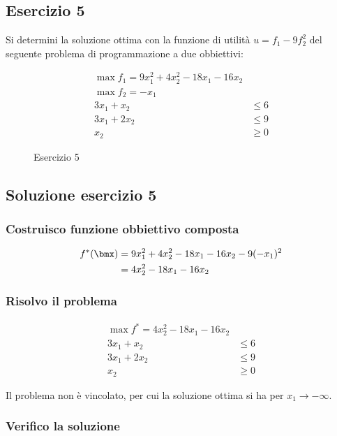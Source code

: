 \documentclass[\main/main.tex]{subfiles}
\begin{document}
\subsection{Esercizio 5}
Si determini la soluzione ottima con la funzione di utilità $u = f_1 - 9f_2^2$ del seguente problema di programmazione a due obbiettivi:

\begin{figure}
  \begin{align*}
    \max f_1 = 9x_1^2 + 4x_2^2 - 18x_1 - 16x_2 \\
    \max f_2 = -x_1                            \\
    3x_1 + x_2  & \leq 6                       \\
    3x_1 + 2x_2 & \leq 9                       \\
    x_2         & \geq 0
  \end{align*}
  \caption{Esercizio 5}
\end{figure}

\subsection{Soluzione esercizio 5}
\subsubsection*{Costruisco funzione obbiettivo composta}
\begin{align*}
  f^*(\bmx) & = 9x_1^2 + 4x_2^2 - 18x_1 - 16x_2 - 9(-x_1)^2 \\
            & = 4x_2^2 - 18x_1 - 16x_2
\end{align*}
\subsubsection*{Risolvo il problema}
\begin{align*}
  \max f^* = 4x_2^2 - 18x_1 - 16x_2 \\
  3x_1 + x_2  & \leq 6              \\
  3x_1 + 2x_2 & \leq 9              \\
  x_2         & \geq 0
\end{align*}

Il problema non è vincolato, per cui la soluzione ottima si ha per $x_1 \to -\infty$.

\subsubsection*{Verifico la soluzione}
\end{document}
